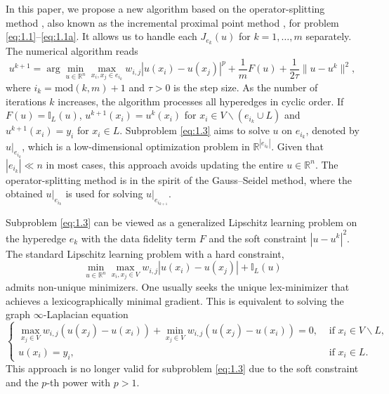 \documentclass{article}
\theoremstyle{definition}
\begin{document}
In this paper, we propose a new algorithm based on the operator-splitting method \cite{glowinski2016some}, also known as the incremental proximal point method \cite{bertsekas2011incremental}, for problem \eqref{eq:1.1}--\eqref{eq:1.1a}.
It allows us to handle each $J_{e_k}(u)$ for $k = 1, \dots, m$ separately.
The numerical algorithm reads
\begin{equation}\label{eq:1.3}
  u^{k+1}=\arg\min_{u\in\mathbb{R}^n}\max_{x_i,x_j\in e_{i_k}}w_{i,j}|u(x_i)-u(x_j)|^p
  +\frac{1}{m}F(u)
  +\frac{1}{2\tau}\|u-u^k\|^2,
\end{equation}
where $i_k=\mbox{mod}(k,m)+1$ and $\tau>0$ is the step size.
As the number of iterations $k$ increases, the algorithm processes all hyperedges in cyclic order.
If $F(u)=\mathbb{I}_{L}(u)$, $u^{k+1}(x_i)=u^{k}(x_i)$ for $x_i\in V\backslash(e_{i_k}\cup L)$ and $u^{k+1}(x_i)=y_i$ for $x_i\in L$.
Subproblem \eqref{eq:1.3} aims to solve $u$ on $e_{i_k}$, denoted by $u|_{e_{i_k}}$, which is a low-dimensional optimization problem in $\mathbb{R}^{|e_{i_k}|}$.
Given that $|e_{i_k}|\ll n$ in most cases, this approach avoids updating the entire $u\in\mathbb{R}^n$.
The operator-splitting method is in the spirit of the Gauss–Seidel method, where the obtained $u|_{e_{i_k}}$
is used for solving $u|_{e_{i_{k+1}}}$.



Subproblem \eqref{eq:1.3} can be viewed as a generalized Lipschitz learning problem on the hyperedge $e_k$ with the data fidelity term $F$ and the soft constraint $|u - u^k|^2$.
The standard Lipschitz learning problem with a hard constraint,
 \begin{equation}\label{eq:1.5}
  \min_{u\in\mathbb{R}^n}\max_{x_i,x_j\in V} w_{i,j}|u(x_i)-u(x_j)|
  +\mathbb{I}_{L}(u)
\end{equation}
admits non-unique minimizers. One usually seeks the unique lex-minimizer that achieves a lexicographically minimal gradient.
This is equivalent to solving the graph $\infty$-Laplacian equation \cite{kyng2015algorithms,calder2019consistency}
 \begin{equation*}
 \begin{cases}
   \max_{x_j\in V}w_{i,j}(u(x_j)-u(x_i))+\min_{x_j\in V}w_{i,j}(u(x_j)-u(x_i))=0, & \mbox{ if } x_i\in V\backslash L, \\
   u(x_i)=y_i, & \mbox{ if } x_i\in L.
 \end{cases}
 \end{equation*}
This approach is no longer valid for subproblem \eqref{eq:1.3} due to the soft constraint and the $p$-th power with $p > 1$.
\end{document}
